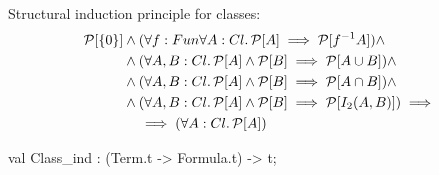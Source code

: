 \begin{node}
Structural induction principle for classes:
\begin{equation*}
\begin{split}
\mathcal{P}[\{0\}]&\land(\forall f:Fun\forall A:Cl\ldotp\mathcal{P}[A]\implies\mathcal{P}[f^{-1}A])\land\\
&\land(\forall A,B:Cl\ldotp\mathcal{P}[A]\land\mathcal{P}[B]\implies\mathcal{P}[A\cup B])\land\\
&\land(\forall A,B:Cl\ldotp\mathcal{P}[A]\land\mathcal{P}[B]\implies\mathcal{P}[A\cap B])\land\\
&\land(\forall A,B:Cl\ldotp\mathcal{P}[A]\land\mathcal{P}[B]\implies\mathcal{P}[I_{2}(A,B)])\implies\\
&\quad\implies(\forall A:Cl\ldotp\mathcal{P}[A])
\end{split}
\end{equation*}
\end{node}

\nwenddocs{}\plusendmoddef\nwstartdeflinemarkup{}\nwenddeflinemarkup
val Class_ind : (Term.t -> Formula.t) -> t;
\nwendcode{}\nwdocspar


